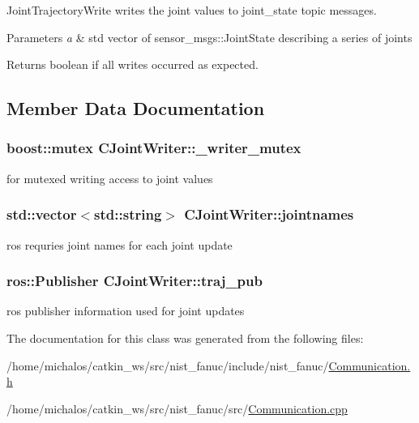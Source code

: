 Joint\-Trajectory\-Write writes the joint values to joint\-\_\-state topic messages. 


\begin{DoxyParams}{Parameters}
{\em a} & std vector of sensor\-\_\-msgs\-::\-Joint\-State describing a series of joints \\
\hline
\end{DoxyParams}
\begin{DoxyReturn}{Returns}
boolean if all writes occurred as expected. 
\end{DoxyReturn}


\subsection{Member Data Documentation}
\hypertarget{classCJointWriter_a1f005dcb6f32e6d161026a6cdda5b66f}{
\subsubsection[{\-\_\-writer\-\_\-mutex}]{\setlength{\rightskip}{0pt plus 5cm}boost\-::mutex C\-Joint\-Writer\-::\-\_\-writer\-\_\-mutex\hspace{0.3cm}{\ttfamily [static]}}}\label{classCJointWriter_a1f005dcb6f32e6d161026a6cdda5b66f}
for mutexed writing access to joint values \hypertarget{classCJointWriter_a3aceb4ba37d60a52c34e486871bc8f58}{
\subsubsection[{jointnames}]{\setlength{\rightskip}{0pt plus 5cm}std\-::vector$<$std\-::string$>$ C\-Joint\-Writer\-::jointnames}}\label{classCJointWriter_a3aceb4ba37d60a52c34e486871bc8f58}
ros requries joint names for each joint update \hypertarget{classCJointWriter_a109841588bf726b430b82a509176bb0c}{
\subsubsection[{traj\-\_\-pub}]{\setlength{\rightskip}{0pt plus 5cm}ros\-::\-Publisher C\-Joint\-Writer\-::traj\-\_\-pub}}\label{classCJointWriter_a109841588bf726b430b82a509176bb0c}
ros publisher information used for joint updates 

The documentation for this class was generated from the following files\-:\begin{DoxyCompactItemize}
\item 
/home/michalos/catkin\-\_\-ws/src/nist\-\_\-fanuc/include/nist\-\_\-fanuc/\hyperlink{Communication_8h}{Communication.\-h}\item 
/home/michalos/catkin\-\_\-ws/src/nist\-\_\-fanuc/src/\hyperlink{Communication_8cpp}{Communication.\-cpp}\end{DoxyCompactItemize}
